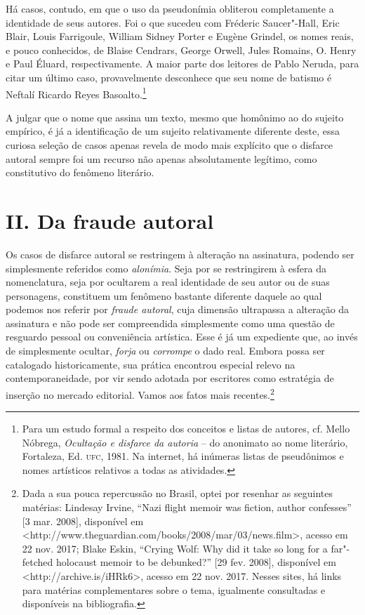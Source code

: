 Há casos, contudo, em que o uso da pseudonímia obliterou completamente a
identidade de seus autores. Foi o que sucedeu com Fréderic Saucer"-Hall,
Eric Blair, Louis Farrigoule, William Sidney Porter e Eugène Grindel, os nomes reais, e pouco conhecidos, de Blaise Cendrars, George Orwell,
Jules Romains, O. Henry e Paul Éluard, respectivamente. A maior parte dos leitores de Pablo Neruda, para citar um último caso, provavelmente
desconhece que seu nome de batismo é Neftalí Ricardo Reyes
Basoalto.\footnote{Para um estudo formal a respeito dos conceitos e
  listas de autores, cf. Mello Nóbrega, \emph{Ocultação e
  disfarce da autoria} -- do anonimato ao nome literário, Fortaleza, Ed.
  \textsc{ufc}, 1981. Na internet, há inúmeras listas de pseudônimos e
  nomes artísticos relativos a todas as atividades.}

A julgar que o nome que assina um texto, mesmo que homônimo ao do
sujeito empírico, é já a identificação de um sujeito relativamente
diferente deste, essa curiosa seleção de casos apenas revela de modo
mais explícito que o disfarce autoral sempre foi um recurso não apenas
absolutamente legítimo, como constitutivo do fenômeno literário.

\section*{II. Da fraude autoral}

Os casos de disfarce autoral se restringem à alteração na assinatura,
podendo ser simplesmente referidos como \emph{alonímia}. Seja por se
restringirem à esfera da nomenclatura, seja por ocultarem a real
identidade de seu autor ou de suas personagens, constituem um fenômeno
bastante diferente daquele ao qual podemos nos referir por \emph{fraude
autoral}, cuja dimensão ultrapassa a alteração da assinatura e não pode
ser compreendida simplesmente como uma questão de resguardo pessoal ou
conveniência artística. Esse é já um expediente que, ao invés de
simplesmente ocultar, \emph{forja} ou \emph{corrompe} o dado real.
Embora possa ser catalogado historicamente, sua prática encontrou
especial relevo na contemporaneidade, por vir sendo adotada por
escritores como estratégia de inserção no mercado editorial. Vamos aos
fatos mais recentes.\footnote{Dada a sua pouca repercussão no Brasil,
  optei por resenhar as seguintes matérias: Lindesay Irvine, ``Nazi
  flight memoir was fiction, author confesses'' {[}3 mar. 2008{]},
  disponível em
  \textless{}http://www.theguardian.com/books/2008/mar/03/news.film\textgreater{},
  acesso em 22 nov. 2017; Blake Eskin, ``Crying Wolf: Why did it take so
  long for a far"-fetched holocaust memoir to be debunked?'' {[}29 fev.
  2008{]}, disponível em
  \textless{}http://archive.is/iHRk6\textgreater{}, acesso em 22 nov.
  2017. Nesses sites, há links para matérias complementares sobre o
  tema, igualmente consultadas e disponíveis na bibliografia.}

